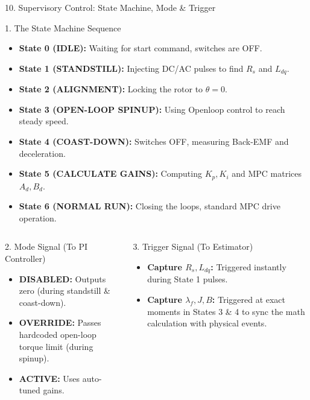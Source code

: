 \documentclass[aspectratio=169]{beamer}
\begin{document}
\begin{frame}{10. Supervisory Control: State Machine, Mode \& Trigger}
    \footnotesize
    \begin{block}{1. The State Machine Sequence}
        \vspace{-1mm}
        \begin{itemize}
            \item \textbf{State 0 (IDLE):} Waiting for start command, switches are OFF.
            \item \textbf{State 1 (STANDSTILL):} Injecting DC/AC pulses to find $R_s$ and $L_{dq}$.
            \item \textbf{State 2 (ALIGNMENT):} Locking the rotor to $\theta = 0$.
            \item \textbf{State 3 (OPEN-LOOP SPINUP):} Using Openloop control to reach steady speed.
            \item \textbf{State 4 (COAST-DOWN):} Switches OFF, measuring Back-EMF and deceleration.
            \item \textbf{State 5 (CALCULATE GAINS):} Computing $K_p, K_i$ and MPC matrices $A_d, B_d$.
            \item \textbf{State 6 (NORMAL RUN):} Closing the loops, standard MPC drive operation.
        \end{itemize}
        \vspace{-1mm}
    \end{block}
    \vspace{-1mm}
    \begin{columns}[T]
        \begin{block}{2. Mode Signal (To PI Controller)}
            \begin{itemize}
                \item \textbf{DISABLED:} Outputs zero (during standstill \& coast-down).
                \item \textbf{OVERRIDE:} Passes hardcoded open-loop torque limit (during spinup).
                \item \textbf{ACTIVE:} Uses auto-tuned gains.
            \end{itemize}
        \end{block}
        \begin{block}{3. Trigger Signal (To Estimator)}
            \begin{itemize}
                \item \textbf{Capture $R_s, L_{dq}$:} Triggered instantly during State 1 pulses.
                \item \textbf{Capture $\lambda_f, J, B$:} Triggered at exact moments in States 3 \& 4 to sync the math calculation with physical events.
            \end{itemize}
        \end{block}
    \end{columns}
\end{frame}
\end{document}
